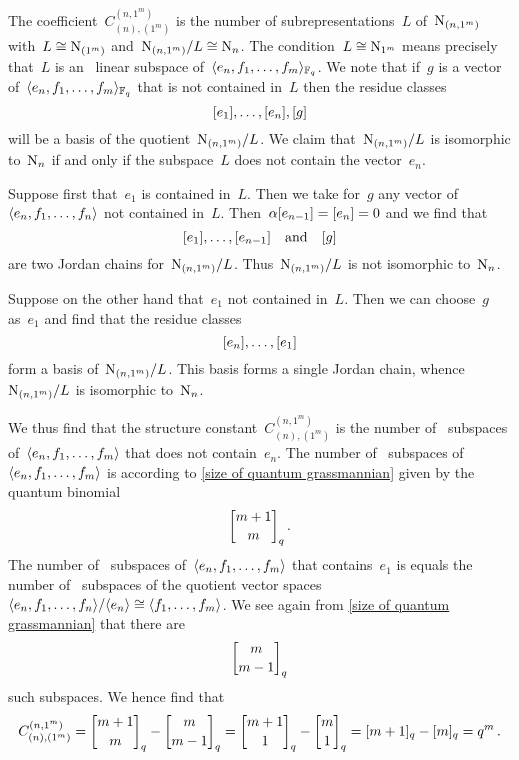 \documentclass[a4paper,11pt]{scrartcl}
\begin{document}
The coefficient~$C^{(n, 1^m)}_{(n), (1^m)}$ is the number of subrepresentations~$L$ of~$\mathrm{N}_{(n, 1^m)}$ with~$L \cong \mathrm{N}_{(1^m)}$ and~$\mathrm{N}_{(n, 1^m)}/L \cong \mathrm{N}_n$.
The condition~$L \cong \mathrm{N}_{1^m}$ means precisely that~$L$ is an~ linear subspace of~$\langle e_n, f_1, \dotsc, f_m \rangle_{\mathbb{F}_q}$.
We note that if~$g$ is a vector of~$\langle e_n, f_1, \dotsc, f_m \rangle_{\mathbb{F}_q}$ that is not contained in~$L$ then the residue classes
\[
  [e_1], \dotsc, [e_n], [g]
\]
will be a basis of the quotient~$\mathrm{N}_{(n, 1^m)} / L$.
We claim that~$\mathrm{N}_{(n, 1^m)} / L$ is isomorphic to~$\mathrm{N}_n$ if and only if the subspace~$L$ does not contain the vector~$e_n$.

Suppose first that~$e_1$ is contained in~$L$.
Then we take for~$g$ any vector of~$\langle e_n, f_1, \dotsc, f_n\rangle$ not contained in~$L$.
Then~$\alpha [e_{n-1}] = [e_n] = 0$ and we find that
\[
  [e_1], \dotsc, [e_{n-1}]
  \quad
  \text{and}
  \quad
  [g]
\]
are two Jordan chains for~$\mathrm{N}_{(n, 1^m)} / L$.
Thus~$\mathrm{N}_{(n, 1^m)} / L$ is not isomorphic to~$\mathrm{N}_n$.

Suppose on the other hand that~$e_1$ not contained in~$L$.
Then we can choose~$g$ as~$e_1$ and find that the residue classes
\[
  [e_n], \dotsc, [e_1]
\]
form a basis of~$\mathrm{N}_{(n, 1^m)} / L$.
This basis forms a single Jordan chain, whence~$\mathrm{N}_{(n, 1^m)} / L$ is isomorphic to~$\mathrm{N}_n$.

We thus find that the structure constant~$C^{(n, 1^m)}_{(n), (1^m)}$ is the number of~ subspaces of~$\langle e_n, f_1, \dotsc, f_m\rangle$ that does not contain~$e_n$.
The number of~ subspaces of~$\langle e_n, f_1, \dotsc, f_m\rangle$ is according to \cref{size of quantum grassmannian} given by the quantum binomial
\[
  \qbinom{m+1}{m}_q \,.
\]
The number of~ subspaces of~$\langle e_n, f_1, \dotsc, f_m\rangle$ that contains~$e_1$ is equals the number of~ subspaces of the quotient vector spaces~$\langle e_n, f_1, \dotsc, f_n\rangle / \langle e_n\rangle \cong \langle f_1, \dotsc, f_m\rangle$.
We see again from \cref{size of quantum grassmannian} that there are
\[
  \qbinom{m}{m-1}_q
\]
such subspaces.
We hence find that
\[
  C^{(n, 1^m)}_{(n), (1^m)}
  =
  \qbinom{m+1}{m}_q - \qbinom{m}{m-1}_q
  =
  \qbinom{m+1}{1}_q - \qbinom{m}{1}_q
  =
  \qnum{m+1}_q - \qnum{m}_q
  =
  q^m \,.
\]
\end{document}
